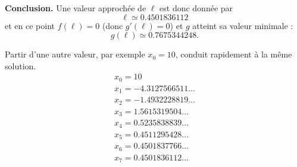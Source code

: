 \documentclass[11pt,class=report,crop=false]{standalone}
\begin{document}
\textbf{Conclusion.} 
Une valeur approchée de $\ell$ est donc donnée par 
$$\ell \simeq 0.4501836112$$
et en ce point $f(\ell)=0$ (donc $g'(\ell)=0$) et $g$ atteint sa valeur minimale :
$$g(\ell) \simeq 0.7675344248.$$

Partir d'une autre valeur, par exemple $x_0 = 10$, conduit rapidement à la même 
solution.
$$
\begin{array}{l}
x_0 = 10 \\
x_1 = -4.3127566511\ldots\\
x_2 = -1.4932228819\ldots\\
x_3 =  1.5615319504\ldots\\
x_4 =  0.5235838839\ldots\\
x_5 =  0.4511295428\ldots\\
x_6 =  0.4501837766\ldots\\
x_7 =  0.4501836112\ldots\\
\end{array}
$$
\end{document}
